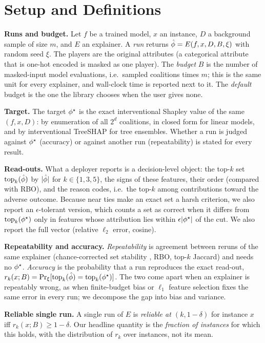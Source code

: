 \section{Setup and Definitions}
\label{sec:setup}

\textbf{Runs and budget.}
Let $f$ be a trained model, $x$ an instance, $D$ a background sample of size $m$, and $E$ an explainer. A \emph{run} returns $\hat\phi=E(f,x,D,B,\xi)$ with random seed $\xi$. The players are the original attributes (a categorical attribute that is one-hot encoded is masked as one player). The \emph{budget} $B$ is the number of masked-input model evaluations, i.e.\ sampled coalitions times $m$; this is the same unit for every explainer, and wall-clock time is reported next to it. The \emph{default} budget is the one the library chooses when the user gives none.

\textbf{Target.}
The target $\phi^{\star}$ is the exact interventional Shapley value of the same $(f,x,D)$: by enumeration of all $2^d$ coalitions, in closed form for linear models, and by interventional TreeSHAP for tree ensembles. Whether a run is judged against $\phi^{\star}$ (accuracy) or against another run (repeatability) is stated for every result.

\textbf{Read-outs.}
What a deployer reports is a decision-level object: the top-$k$ set $\mathrm{top}_k(\hat\phi)$ by $|\hat\phi|$ for $k\in\{1,3,5\}$, the signs of these features, their order (compared with RBO), and the reason codes, i.e.\ the top-$k$ among contributions toward the adverse outcome. Because near ties make an exact set a harsh criterion, we also report an $\epsilon$-tolerant version, which counts a set as correct when it differs from $\mathrm{top}_k(\phi^{\star})$ only in features whose attribution lies within $\epsilon|\phi^{\star}|$ of the cut. We also report the full vector (relative $\ell_2$ error, cosine).

\textbf{Repeatability and accuracy.}
\emph{Repeatability} is agreement between reruns of the same explainer (chance-corrected set stability \citep{nogueira2018stability}, RBO, top-$k$ Jaccard) and needs no $\phi^{\star}$. \emph{Accuracy} is the probability that a run reproduces the exact read-out, $r_k(x;B)=\Pr_\xi[\mathrm{top}_k(\hat\phi)=\mathrm{top}_k(\phi^{\star})]$. The two come apart when an explainer is repeatably wrong, as when finite-budget bias or $\ell_1$ feature selection fixes the same error in every run; we decompose the gap into bias and variance.

\textbf{Reliable single run.}
A single run of $E$ is \emph{reliable at $(k,1-\delta)$} for instance $x$ iff $r_k(x;B)\ge 1-\delta$. Our headline quantity is the \emph{fraction of instances} for which this holds, with the distribution of $r_k$ over instances, not its mean.

